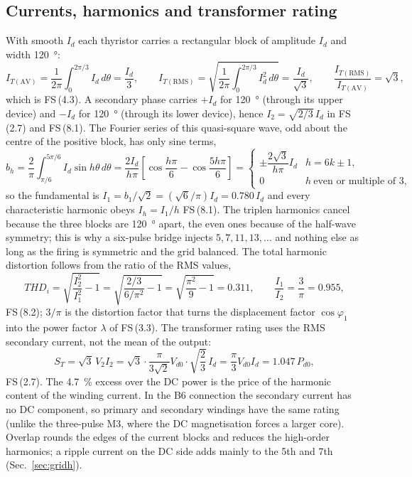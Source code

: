 \documentclass[10pt,a4paper]{scrartcl}
\newcommand{\Vdo}{V_{d0}}
\newcommand{\Id}{I_{d}}
\newcommand{\Vll}{V_{2}}
\newcommand{\ITav}{I_{T\mathrm{(AV)}}}
\newcommand{\ITrms}{I_{T\mathrm{(RMS)}}}
\newcommand{\fs}[1]{\textsf{FS}\,(#1)}
\begin{document}
\subsection{Currents, harmonics and transformer rating}\label{sec:currents}
With smooth $\Id$ each thyristor carries a rectangular block of amplitude $\Id$ and width \SI{120}{\degree}:
\begin{equation}
\ITav = \frac{1}{2\pi}\int_0^{2\pi/3}\Id\,d\theta = \frac{\Id}{3}, \qquad
\ITrms = \sqrt{\frac{1}{2\pi}\int_0^{2\pi/3}\Id^2\,d\theta} = \frac{\Id}{\sqrt3}, \qquad
\frac{\ITrms}{\ITav} = \sqrt3 ,
\label{eq:ITderiv}
\end{equation}
which is \fs{4.3}. A secondary phase carries $+\Id$ for \SI{120}{\degree} (through its upper device) and $-\Id$ for \SI{120}{\degree} (through its lower device), hence $I_2 = \sqrt{2/3}\,\Id$ in \fs{2.7} and \fs{8.1}. The Fourier series of this quasi-square wave, odd about the centre of the positive block, has only sine terms,
\begin{equation}
b_h = \frac{2}{\pi}\int_{\pi/6}^{5\pi/6}\Id\sin h\theta\,d\theta = \frac{2\Id}{h\pi}\left[\cos\frac{h\pi}{6}-\cos\frac{5h\pi}{6}\right] =
\begin{cases}
\pm\dfrac{2\sqrt3}{h\pi}\Id & h = 6k\pm1,\\[6pt]
0 & h \ \text{even or multiple of 3},
\end{cases}
\label{eq:fourierI}
\end{equation}
so the fundamental is $I_1 = b_1/\sqrt2 = (\sqrt6/\pi)\Id = 0.780\,\Id$ and every characteristic harmonic obeys $I_h = I_1/h$ \fs{8.1}. The triplen harmonics cancel because the three blocks are \SI{120}{\degree} apart, the even ones because of the half-wave symmetry; this is why a six-pulse bridge injects $5, 7, 11, 13, \ldots$ and nothing else as long as the firing is symmetric and the grid balanced. The total harmonic distortion follows from the ratio of the RMS values,
\begin{equation}
THD_i = \sqrt{\frac{I_2^2}{I_1^2}-1} = \sqrt{\frac{2/3}{6/\pi^2}-1} = \sqrt{\frac{\pi^2}{9}-1} = 0.311 ,
\qquad \frac{I_1}{I_2} = \frac{3}{\pi} = 0.955 ,
\label{eq:THDderiv}
\end{equation}
\fs{8.2}; $3/\pi$ is the distortion factor that turns the displacement factor $\cos\varphi_1$ into the power factor $\lambda$ of \fs{3.3}. The transformer rating uses the RMS secondary current, not the mean of the output:
\begin{equation}
S_T = \sqrt3\,\Vll I_2 = \sqrt3\cdot\frac{\pi}{3\sqrt2}\Vdo\cdot\sqrt{\frac23}\,\Id = \frac{\pi}{3}\Vdo\Id = 1.047\,P_{d0} ,
\label{eq:STderiv}
\end{equation}
\fs{2.7}. The \SI{4.7}{\percent} excess over the DC power is the price of the harmonic content of the winding current. In the B6 connection the secondary current has no DC component, so primary and secondary windings have the same rating (unlike the three-pulse M3, where the DC magnetisation forces a larger core). Overlap rounds the edges of the current blocks and reduces the high-order harmonics; a ripple current on the DC side adds mainly to the 5th and 7th (Sec.~\ref{sec:gridh}).
\end{document}
